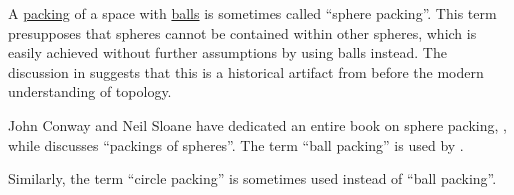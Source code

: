 \begin{remark}\label{rem:sphere_packing}
  A \hyperref[def:topological_space_packing]{packing} of a space with \hyperref[def:metric_space/ball]{balls} is sometimes called \enquote{sphere packing}. This term presupposes that spheres cannot be contained within other spheres, which is easily achieved without further assumptions by using balls instead. The discussion in \cite{MathOF:sphere_packing_vs_ball_packing} suggests that this is a historical artifact from before the modern understanding of topology.

  John Conway and Neil Sloane have dedicated an entire book on sphere packing, \cite{ConwaySloane1998SpherePackings}, while \textcite[ch. 7]{Rogers1964PackingAndCovering} discusses \enquote{packings of spheres}. The term \enquote{ball packing} is used by \textcite[327]{Gruber2007ConvexAndDiscreteGeometry}.

  Similarly, the term \enquote{circle packing} is sometimes used instead of \enquote{ball packing}.
\end{remark}

